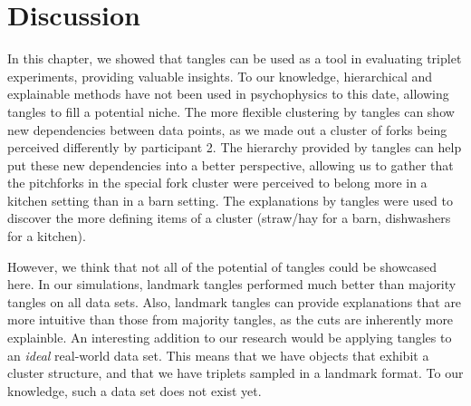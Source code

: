\section{Discussion}
In this chapter, we showed that tangles can be used as a tool in evaluating triplet experiments, providing valuable insights. 
To our knowledge, hierarchical and explainable methods
have not been used in psychophysics to this date, allowing tangles to fill a potential niche.
The more flexible clustering by tangles can show new dependencies between data points, as we 
made out a cluster of forks being perceived differently by participant 2. The hierarchy 
provided by tangles can help put these new dependencies into a better perspective, 
allowing us to gather that the pitchforks in the special fork cluster were perceived to 
belong more in a kitchen setting than in a barn setting.
The explanations by tangles were used to discover the more defining items of a cluster (straw/hay for
a barn, dishwashers for a kitchen). 

However, we think that not all of the potential of tangles could be showcased here. 
In our simulations, landmark tangles performed much better than majority tangles on all data sets.
Also, landmark tangles can provide explanations that are more intuitive than those from majority tangles,
as the cuts are inherently more explainble. An interesting addition to our research would 
be applying tangles to an \textit{ideal} real-world data set. This means that we have objects
that exhibit a cluster structure, and that we have triplets sampled in a landmark format.
To our knowledge, such a data set does not exist yet.

